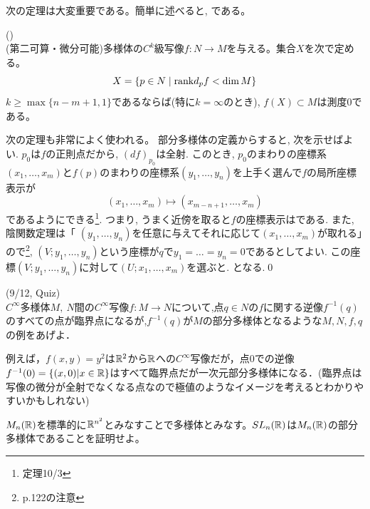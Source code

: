 次の定理は大変重要である。簡単に述べると, である。
\besha
\begin{theo} () \label{theo:sard}\\
(第二可算・微分可能)多様体の$C^{k}$級写像$f:N\to M$を与える。集合$X$を次で定める。
\[ X = \{p\in N\mid  \mathrm{rank}d_{p} f < \dim{M}\} \]
$k\geq \max{\{ n-m+1, 1 \}}$であるならば(特に$k=\infty$のとき), $f(X)\subset M$は測度$0$である。
\end{theo}
\ensha
次の定理も非常によく使われる。
\prf 部分多様体の定義からすると, 次を示せばよい.
\prf $p_0$は$f$の正則点だから, $(df)_{p_0}$は全射. このとき,   $p_0$のまわりの座標系$(x_1,\dots, x_m)$と$f(p)$のまわりの座標系$(y_1,\dots, y_n)$を上手く選んで$f$の局所座標表示が
\[(x_1,\dots, x_m) \mapsto (x_{m-n+1},\dots, x_{m})\]
であるようにできる\footnote{\cite{matsumoto}定理10/3}. つまり, うまく近傍を取ると$f$の座標表示はである. また, 陰関数定理は「 $(y_1,\dots, y_n)$を任意に与えてそれに応じて$(x_1,\dots, x_m)$が取れる」ので\footnote{\cite{matsumoto}p.122の注意}, $(V;y_1,\dots, y_n)$という座標が$q$で$y_1=\dots = y_n = 0$であるとしてよい. この座標$(V;y_1,\dots,y_n)$に対して$(U;x_1,\dots, x_m)$を選ぶと.
となる.\qed



\begin{egprob} (9/12, Quiz)\\
$C^{\infty}$多様体$M,~N$間の$C^{\infty}$写像$f:M\to N$について,点$q\in N$の$f$に関する逆像$f^{-1}(q)$のすべての点が臨界点になるが,$f^{-1}(q)$が$M$の部分多様体となるような$M,N,f,q$の例をあげよ．
\end{egprob}
\begin{egans}
例えば，$f(x,y)=y^2$は$\mathbb{R}^2$から$\mathbb{R}$への$C^{\infty}$写像だが，点$0$での逆像$f^{-1}(0)=\{(x,0)|x\in\mathbb{R}\}$はすべて臨界点だが一次元部分多様体になる．(臨界点は写像の微分が全射でなくなる点なので極値のようなイメージを考えるとわかりやすいかもしれない)
\end{egans}
\begin{egprob}
$M_n(\mathbb{R})$を標準的に$\mathbb{R}^{n^2}$とみなすことで多様体とみなす。$SL_n(\mathbb{R})$は$M_n(\mathbb{R})$の部分多様体であることを証明せよ。
\end{egprob}


